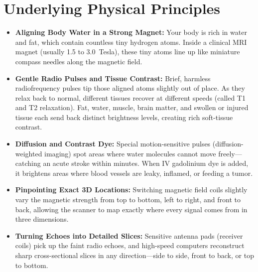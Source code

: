 \section{Underlying Physical Principles}
\begin{itemize}
\item \textbf{Aligning Body Water in a Strong Magnet:} Your body is rich in water and fat, which contain countless tiny hydrogen atoms. Inside a clinical MRI magnet (usually 1.5 to 3.0~Tesla), these tiny atoms line up like miniature compass needles along the magnetic field.
\item \textbf{Gentle Radio Pulses and Tissue Contrast:} Brief, harmless radiofrequency pulses tip those aligned atoms slightly out of place. As they relax back to normal, different tissues recover at different speeds (called T1 and T2 relaxation). Fat, water, muscle, brain matter, and swollen or injured tissue each send back distinct brightness levels, creating rich soft-tissue contrast.
\item \textbf{Diffusion and Contrast Dye:} Special motion-sensitive pulses (diffusion-weighted imaging) spot areas where water molecules cannot move freely---catching an acute stroke within minutes. When IV gadolinium dye is added, it brightens areas where blood vessels are leaky, inflamed, or feeding a tumor.
\item \textbf{Pinpointing Exact 3D Locations:} Switching magnetic field coils slightly vary the magnetic strength from top to bottom, left to right, and front to back, allowing the scanner to map exactly where every signal comes from in three dimensions.
\item \textbf{Turning Echoes into Detailed Slices:} Sensitive antenna pads (receiver coils) pick up the faint radio echoes, and high-speed computers reconstruct sharp cross-sectional slices in any direction---side to side, front to back, or top to bottom.
\end{itemize}

